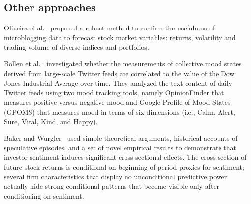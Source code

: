\documentclass[review,3p,times,12pt,number]{elsarticle}
\begin{document}
\subsection{Other approaches}
Oliveira el al.~\cite{Oliveira2017The} proposed a robust method to confirm the usefulness of microblogging data to forecast stock market variables: returns, volatility and trading volume of diverse indices and portfolios.

Bollen et al.~\cite{bollen2011twitter} investigated whether the measurements of collective mood states derived from large-scale Twitter feeds are correlated to the value of the Dow Jones Industrial Average over time. They analyzed the text content of daily Twitter feeds using two mood tracking tools, namely OpinionFinder that measures positive versus negative mood and Google-Profile of Mood States (GPOMS) that measures mood in terms of six dimensions (i.e., Calm, Alert, Sure, Vital, Kind, and Happy).

Baker and Wurgler~\cite{baker2006} used simple theoretical arguments, historical accounts of speculative episodes, and a set of novel empirical results to demonstrate that investor sentiment induces significant cross-sectional effects. The cross-section of future stock returns is conditional on beginning-of-period proxies for sentiment; several firm characteristics that display no unconditional predictive power actually hide strong conditional patterns that become visible only after conditioning on sentiment.






\end{document}

